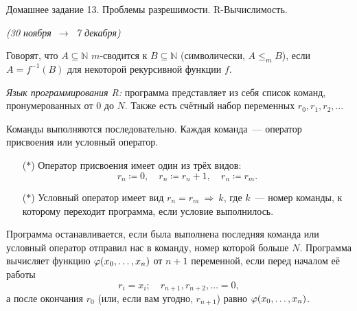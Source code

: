 \documentclass[a4paper,11pt]{article}
\begin{document}
   \newcommand{\enumsep}{\vspace{-2.8mm}
   		\begin{enumerate}[itemsep=0.4mm,leftmargin=2.5mm]}

\begin{center}
	{\Large Домашнее задание 13. Проблемы разрешимости. R-Вычислимость.}

	{\it (30 ноября\ \(\to\)\ 7 декабря)}
\end{center}

Говорят, что $A\subseteq\mathbb{N}$ $m$-сводится к $B\subseteq\mathbb{N}$ (символически, $A\leq_m B$), если  $A=f^{-1}(B)$ для некоторой рекурсивной функции $f$.

{\it Язык программирования R:} программа представляет из себя список команд, пронумерованных от 0 до \(N\). Также есть счётный набор переменных \(r_0, r_1, r_2, \ldots\)

Команды выполняются последовательно. Каждая команда~— оператор присвоения или условный оператор. \begin{enumerate}
	\item[(\(*\))] Оператор присвоения имеет один из трёх видов: \[r_n \coloneqq 0,\quad r_n \coloneqq r_n+1,\quad r_n\coloneqq r_m.\]
	\item[(\(*\))] Условный оператор имеет вид \(r_n = r_m\ \Rightarrow\ k\), где \(k\)~— номер команды, к которому переходит программа, если условие выполнилось.
\end{enumerate}

Программа останавливается, если была выполнена последняя команда или условный оператор отправил нас в команду, номер которой больше \(N\). Программа вычисляет функцию \(\varphi \lr*{x_0,\ldots,x_n}\) от \(n+1\) переменной, если перед началом её работы
	\[r_i = x_i;\quad r_{n+1}, r_{n+2}, \ldots = 0,\]
а после окончания \(r_0\) (или, если вам угодно, \(r_{n+1}\)) равно \(\varphi \lr*{x_0,\ldots,x_n}\).

\end{document}
